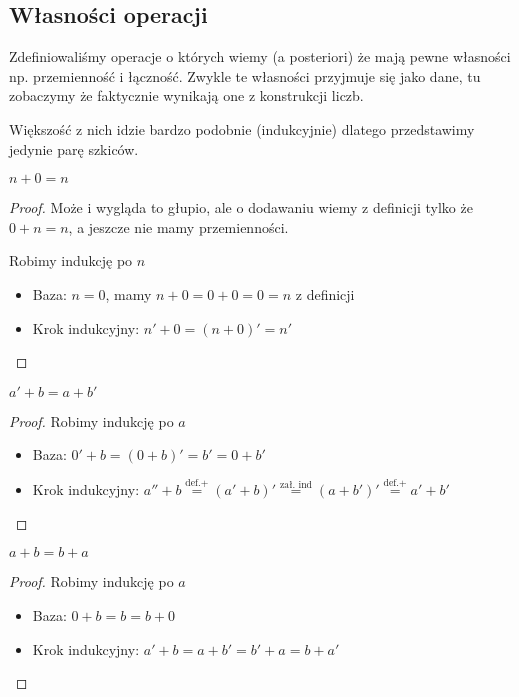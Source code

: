 \subsection{Własności operacji}

Zdefiniowaliśmy operacje o których wiemy (a posteriori) że mają pewne własności np. przemienność i łączność. Zwykle te własności przyjmuje się jako dane, tu zobaczymy że faktycznie wynikają one z konstrukcji liczb.

Większość z nich idzie bardzo podobnie (indukcyjnie) dlatego przedstawimy jedynie parę szkiców.

\begin{lemma}
    \( n + 0 = n \)
\end{lemma}
\begin{proof}
    Może i wygląda to głupio, ale o dodawaniu wiemy z definicji tylko że \( 0 + n = n \), a jeszcze nie mamy przemienności.
    
    Robimy indukcję po \( n \)
    \begin{itemize}
        \item Baza: \( n = 0 \), mamy \( n + 0 = 0 + 0 = 0 = n \) z definicji
        \item Krok indukcyjny: \( n' + 0 = (n + 0)' = n' \)
    \end{itemize}
\end{proof}

\begin{lemma}
    \( a' + b = a + b' \)
\end{lemma}
\begin{proof}
    Robimy indukcję po \( a \)
    \begin{itemize}
        \item Baza: \( 0' + b = (0 + b)' = b' = 0 + b' \)
        \item Krok indukcyjny: \( a'' + b \stackrel{\text{def.} +}{=} (a' + b)' \stackrel{\text{zał. ind}}{=} (a + b')' \stackrel{\text{def.} +}{=} a' + b' \)
    \end{itemize}
\end{proof}


\begin{theorem}
    \( a + b = b + a \)
\end{theorem}
\begin{proof}
    Robimy indukcję po \( a \)
    \begin{itemize}
        \item Baza: \( 0 + b = b = b + 0 \)
        \item Krok indukcyjny: \( a' + b = a + b' = b' + a = b + a' \)
    \end{itemize}
\end{proof}

